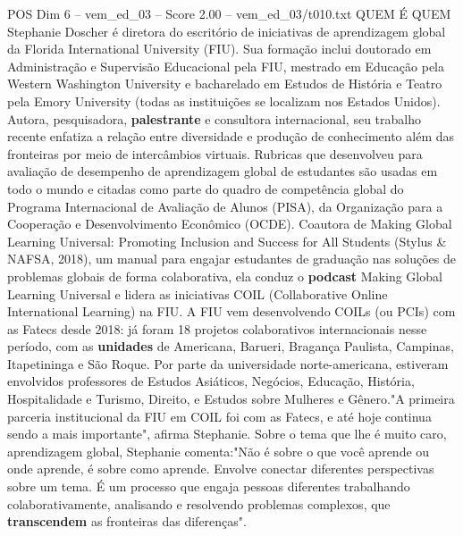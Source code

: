 \begin{textsample}{POS Dim 6 – vem\_ed\_03 – Score 2.00 – vem\_ed\_03/t010.txt}  \label{ex:f6_pos_014}
QUEM É QUEM Stephanie Doscher é diretora do escritório de iniciativas de aprendizagem global da Florida International University (FIU).
Sua formação inclui doutorado em Administração e Supervisão Educacional pela FIU, mestrado em Educação pela Western Washington University e bacharelado em Estudos de História e Teatro pela Emory University (todas as instituições se localizam nos Estados Unidos).
Autora, pesquisadora, \textbf{palestrante} e consultora internacional, seu trabalho recente enfatiza a relação entre diversidade e produção de conhecimento além das fronteiras por meio de intercâmbios virtuais.
Rubricas que desenvolveu para avaliação de desempenho de aprendizagem global de estudantes são usadas em todo o mundo e citadas como parte do quadro de competência global do Programa Internacional de Avaliação de Alunos (PISA), da Organização para a Cooperação e Desenvolvimento Econômico (OCDE).
Coautora de Making Global Learning Universal: Promoting Inclusion and Success for All Students (Stylus \& NAFSA, 2018), um manual para engajar estudantes de graduação nas soluções de problemas globais de forma colaborativa, ela conduz o \textbf{podcast} Making Global Learning Universal e lidera as iniciativas COIL (Collaborative Online International Learning) na FIU.
A FIU vem desenvolvendo COILs (ou PCIs) com as Fatecs desde 2018: já foram 18 projetos colaborativos internacionais nesse período, com as \textbf{unidades} de Americana, Barueri, Bragança Paulista, Campinas, Itapetininga e São Roque.
Por parte da universidade norte-americana, estiveram envolvidos professores de Estudos Asiáticos, Negócios, Educação, História, Hospitalidade e Turismo, Direito, e Estudos sobre Mulheres e Gênero."A primeira parceria institucional da FIU em COIL foi com as Fatecs, e até hoje continua sendo a mais importante", afirma Stephanie.
Sobre o tema que lhe é muito caro, aprendizagem global, Stephanie comenta:"Não é sobre o que você aprende ou onde aprende, é sobre como aprende.
Envolve conectar diferentes perspectivas sobre um tema.
É um processo que engaja pessoas diferentes trabalhando colaborativamente, analisando e resolvendo problemas complexos, que \textbf{transcendem} as fronteiras das diferenças".

\end{textsample}
